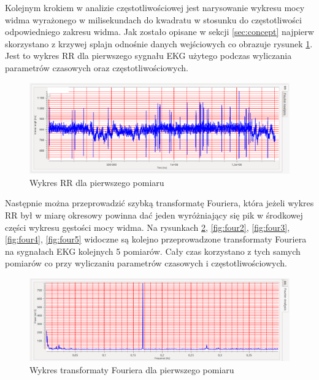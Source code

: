 \tab Kolejnym krokiem w analizie częstotliwościowej jest narysowanie wykresu mocy widma wyrażonego w milisekundach do kwadratu w stosunku do częstotliwości odpowiedniego zakresu widma. Jak zostało opisane w sekcji \ref{sec:concept} najpierw skorzystano z krzywej splajn odnośnie danych wejściowych co obrazuje rysunek \ref{fig:rr1}. Jest to wykres RR dla pierwszego sygnału EKG użytego podczas wyliczania parametrów czasowych oraz częstotliwościowych.

\vspace{5mm}

\begin{figure}[ht]
\centering
\includegraphics[scale=0.4]{HRV1/foty/100/RR1.png}
\caption{Wykres RR dla pierwszego pomiaru}
\label{fig:rr1}
\end{figure}

\vspace{5mm}

\newpage

Następnie można  przeprowadzić szybką transformatę Fouriera, która jeżeli wykres RR był w miarę okresowy powinna dać jeden wyróżniający się pik w środkowej części wykresu gęstości mocy widma. Na rysunkach \ref{fig:four1}, \ref{fig:four2}, \ref{fig:four3}, \ref{fig:four4}, \ref{fig:four5} widoczne są kolejno przeprowadzone transformaty Fouriera na sygnałach EKG kolejnych 5 pomiarów. Cały czas korzystano z tych samych pomiarów co przy wyliczaniu parametrów czasowych i częstotliwościowych.

\vspace{5mm}

\begin{figure}[ht]
\centering
\includegraphics[scale=0.4]{HRV1/foty/100/fourier1.png}
\caption{Wykres transformaty Fouriera dla pierwszego pomiaru}
\label{fig:four1}
\end{figure}

